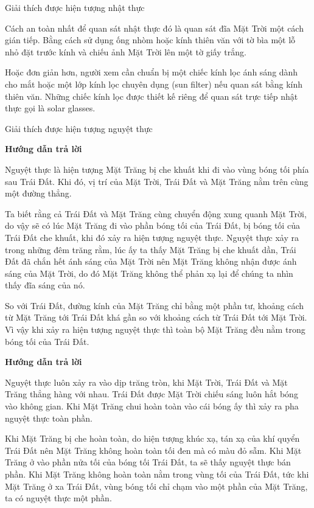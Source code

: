 \begin{dang}{Giải thích được hiện tượng nhật thực}
{		Cách an toàn nhất để quan sát nhật thực đó là quan sát đĩa Mặt Trời một cách gián tiếp. Bằng cách sử dụng ống nhòm hoặc kính thiên văn với tờ bìa một lỗ nhỏ đặt trước kính và chiếu ảnh Mặt Trời lên một tờ giấy trắng.
		
		Hoặc đơn giản hơn, người xem cần chuẩn bị một chiếc kính lọc ánh sáng dành cho mắt hoặc một lớp kính lọc chuyên dụng (sun filter) nếu quan sát bằng kính thiên văn. Những chiếc kính lọc được thiết kế riêng để quan sát trực tiếp nhật thực gọi là solar glasses.
		
	}
\end{dang}
\begin{dang}{Giải thích được hiện tượng nguyệt thực}
	{	\begin{center}
			\textbf{Hướng dẫn trả lời}
		\end{center}
		
		Nguyệt thực là hiện tượng Mặt Trăng bị che khuất khi đi vào vùng bóng tối phía sau Trái Đất. Khi đó, vị trí của Mặt Trời, Trái Đất và Mặt Trăng nằm trên cùng một đường thẳng.
		
		Ta biết rằng cả Trái Đất và Mặt Trăng cùng chuyển động xung quanh Mặt Trời, do vậy sẽ có lúc Mặt Trăng đi vào phần bóng tối của Trái Đất, bị bóng tối của Trái Đất che khuất, khi đó xảy ra hiện tượng nguyệt thực. Nguyệt thực xảy ra trong những đêm trăng rằm, lúc ấy ta thấy Mặt Trăng bị che khuất dần, Trái Đất đã chắn hết ánh sáng của Mặt Trời nên Mặt Trăng không nhận được ánh sáng của Mặt Trời, do đó Mặt Trăng không thể phản xạ lại để chúng ta nhìn thấy đĩa sáng của nó.
		
		So với Trái Đất, đường kính của Mặt Trăng chỉ bằng một phần tư, khoảng cách từ Mặt Trăng tới Trái Đất khá gần so với khoảng cách từ Trái Đất tới Mặt Trời. Vì vậy khi xảy ra hiện tượng nguyệt thực thì toàn bộ Mặt Trăng đều nằm trong bóng tối của Trái Đất.
		
		
	}
	{	\begin{center}
			\textbf{Hướng dẫn trả lời}
		\end{center}
		
		Nguyệt thực luôn xảy ra vào dịp trăng tròn, khi Mặt Trời, Trái Đất và Mặt Trăng thẳng hàng với nhau. Trái Đất được Mặt Trời chiếu sáng luôn hắt bóng vào không gian. Khi Mặt Trăng chui hoàn toàn vào cái bóng ấy thì xảy ra pha nguyệt thực toàn phần.
		
		Khi Mặt Trăng bị che hoàn toàn, do hiện tượng khúc xạ, tán xạ của khí quyển Trái Đất nên Mặt Trăng không hoàn toàn tối đen mà có màu đỏ sẫm. Khi Mặt Trăng ở vào phần nửa tối của bóng tối Trái Đất, ta sẽ thấy nguyệt thực bán phần. Khi Mặt Trăng không hoàn toàn nằm trong vùng tối của Trái Đất, tức khi Mặt Trăng ở xa Trái Đất, vùng bóng tối chỉ chạm vào một phần của Mặt Trăng, ta có nguyệt thực một phần.
	}
\end{dang}
